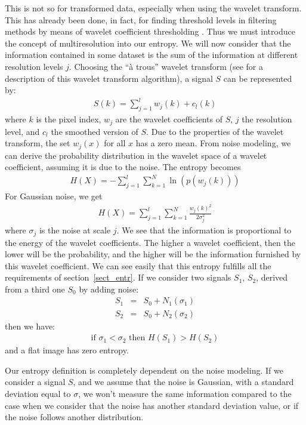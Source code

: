 \documentclass[11pt,a4paper]{article}
\begin{document}
This is not so for transformed data, especially when using  
the wavelet transform. 
This has  already been done, in fact,
for finding threshold levels in filtering 
methods by means of wavelet coefficient thresholding \cite{starck95}. Thus we 
must introduce the concept of multiresolution into our entropy.
We will now consider that the information contained in some dataset
is the sum of the information at different resolution levels $j$.
Choosing the ``\`a trous'' wavelet transform (see \cite{starck95} 
for a description of this wavelet transform algorithm), a signal $S$ can 
be represented by:
\begin{eqnarray}
S(k) = \sum_{j=1}^{l} w_j(k) + c_l(k)
\end{eqnarray}
where $k$ is the pixel index, $w_j$ are the wavelet coefficients of $S$, $j$ the 
resolution
level, and $c_l$ the smoothed version of $S$. Due to the properties of
the wavelet transform, the set $w_j(x)$ for all $x$ has a zero mean. From 
noise modeling, we can derive the probability distribution in the 
wavelet space of a wavelet coefficient, assuming it is due to the noise. 
The entropy becomes
\begin{eqnarray}
H(X) = - \sum_{j=1}^{l}  \sum_{k=1}^{N} \ln ( p(w_j(k)))
\end{eqnarray}
For Gaussian noise, we get
\begin{eqnarray}
H(X) =  \sum_{j=1}^{l}  \sum_{k=1}^{N} \frac{w_j(k)^2}{2 \sigma_j^2}
\end{eqnarray}
where $\sigma_j$ is the noise at scale $j$. We see that 
the information is proportional
to the energy of the wavelet coefficients.
The higher a wavelet coefficient, then the lower will be the  probability, and the 
higher will
be the information furnished by this wavelet coefficient. We can see
easily that this entropy fulfills all the requirements of 
section~\ref{sect_entr}.
If we consider two signals $S_1$, $S_2$, derived from a third one $S_0$ by 
adding noise:
\begin{eqnarray}
S_1 & = & S_0 + N_1(\sigma_1) \\ \nonumber
S_2 & = & S_0 + N_2(\sigma_2)
\end{eqnarray}
then we have:
\begin{eqnarray}
\mbox{if } \sigma_1 < \sigma_2 \mbox{ then } H(S_1) > H(S_2)
\end{eqnarray}
and a flat image has zero entropy. 

Our entropy definition is completely dependent on the noise modeling.
If we consider a signal $S$, and we assume that the noise is Gaussian, with 
a  standard deviation equal to $\sigma$, we won't measure the same
information compared to  the case when we consider that the noise has 
another standard deviation
value, or if the noise follows another distribution.
\end{document}
